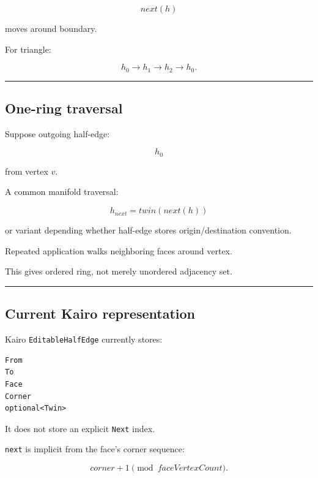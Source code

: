 \[
next(h)
\]

moves around boundary.

For triangle:

\[
h_0\rightarrow h_1\rightarrow h_2\rightarrow h_0.
\]

\begin{center}\rule{0.5\linewidth}{0.5pt}\end{center}

\subsection{One-ring traversal}\label{04-visual-computing-ii-ch041-one-ring-traversal}

\hypertarget{04-visual-computing-ii-ch041-one-ring-traversal}{}

Suppose outgoing half-edge:

\[
h_0
\]

from vertex \(v\).

A common manifold traversal:

\[
\boxed{
h_{next}
=
twin(next(h))
}
\]

or variant depending whether half-edge stores origin/destination convention.

Repeated application walks neighboring faces around vertex.

This gives ordered ring, not merely unordered adjacency set.

\begin{center}\rule{0.5\linewidth}{0.5pt}\end{center}

\subsection{Current Kairo representation}\label{04-visual-computing-ii-ch041-current-kairo-representation}

\hypertarget{04-visual-computing-ii-ch041-current-kairo-representation}{}

Kairo \texttt{EditableHalfEdge} currently stores:

\begin{verbatim}
From
To
Face
Corner
optional<Twin>
\end{verbatim}

It does not store an explicit \texttt{Next} index.

\texttt{next} is implicit from the face's corner sequence:

\[
corner+1\pmod{faceVertexCount}.
\]


